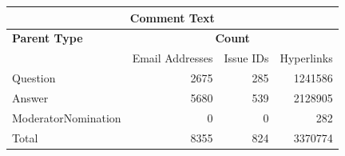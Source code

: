 \documentclass{article}
\begin{document}
\vspace{\baselineskip}

\begin{tabular}[t]{| l | r | r | r |}
\hline
\multicolumn{4}{|c|}{Comment Text} \\ \hline
\bf{Parent Type} & \multicolumn{3}{|c|}{\bf{Count}} \\ \hline
 & Email Addresses & Issue IDs & Hyperlinks \\ \hline
Question & 2675 & 285 & 1241586 \\ \hline
Answer &  5680 & 539 & 2128905 \\ \hline
ModeratorNomination & 0 & 0 & 282 \\ \hline
Total& 8355 & 824 & 3370774 \\ \hline      
\end{tabular}

{}

\end{document}
